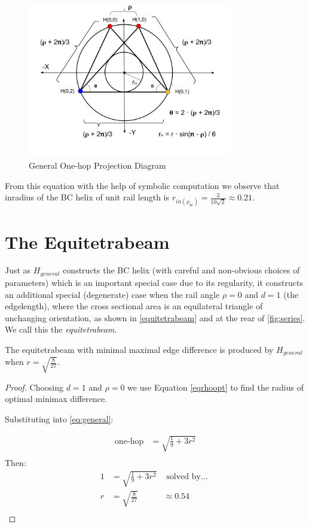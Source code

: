 \documentclass[review]{siamonline1116}
\begin{document}
\begin{figure}[H]
     \centering
     \includegraphics[width=0.8\textwidth]{figures/ProjectionDiagram.png}
     \caption{General One-hop Projection Diagram}
  \label{projectiondiagram}
     
\end{figure}

From this equation with the help of symbolic computation we observe that inradius of the BC helix of unit rail length is $r_{in(\rho_{bc})} = \frac{3}{10\sqrt{2}} \approx 0.21$.

\section{The Equitetrabeam}
\label{sec:equitetrabeam}

Just as $H_{general}$ constructs the BC helix (with careful and non-obvious choices of parameters)
which is an important
special case due to its regularity, it constructs an additional special
(degenerate) case when the rail angle $\rho = 0$
and $d = 1$ (the edgelength), where the cross sectional area is
an equilateral triangle of unchanging orientation, as shown in \cref{equitetrabeam} and at the rear of \cref{fig:series}.
We call this the \emph{equitetrabeam}.



\begin{corollary}
  The equitetrabeam with minimal maximal edge difference is produced
  \newline by $H_{general}$ when $ r = \sqrt{\frac{8}{27}} $.
\end{corollary}

\begin{proof}
Choosing $d = 1$ and $\rho = 0$ we use Equation \eqref{eqrhoopt} to find the radius of 
optimal minimax difference.

Substituting into \eqref{eq:general}:

\begin{align*}
  \text{one-hop} &= \sqrt{\frac{1}{9} + 3r^2}\\
\end{align*}
Then:
\begin{align*}
   1  &=  \sqrt{\frac{1}{9} + 3r^2} & \text{ solved by... }\\
   r  &= \sqrt{\frac{8}{27}} &\approx 0.54 \\
\end{align*}
\end{proof}
\end{document}
